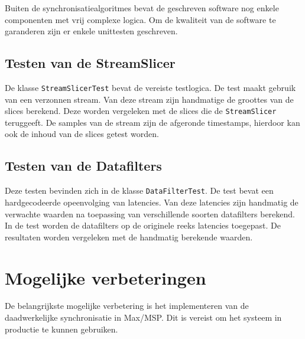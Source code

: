Buiten de synchronisatiealgoritmes bevat de geschreven software nog enkele componenten met vrij complexe logica. Om de kwaliteit van de software te garanderen zijn er enkele unittesten geschreven.

\subsection{Testen van de StreamSlicer}

De klasse \texttt{StreamSlicerTest} bevat de vereiste testlogica. De test maakt gebruik van een verzonnen stream. Van deze stream zijn handmatige de groottes van de slices berekend. Deze worden vergeleken met de slices die de \texttt{StreamSlicer} teruggeeft. De samples van de stream zijn de afgeronde timestamps, hierdoor kan ook de inhoud van de slices getest worden.


\subsection{Testen van de Datafilters}


Deze testen bevinden zich in de klasse \texttt{DataFilterTest}. De test bevat een hardgecodeerde opeenvolging van latencies. Van deze latencies zijn handmatig de verwachte waarden na toepassing van verschillende soorten datafilters berekend. In de test worden de datafilters op de originele reeks latencies toegepast. De resultaten worden vergeleken met de handmatig berekende waarden.

\section{Mogelijke verbeteringen}

De belangrijkste mogelijke verbetering is het implementeren van de daadwerkelijke synchronisatie in Max/MSP. Dit is vereist om het systeem in productie te kunnen gebruiken.